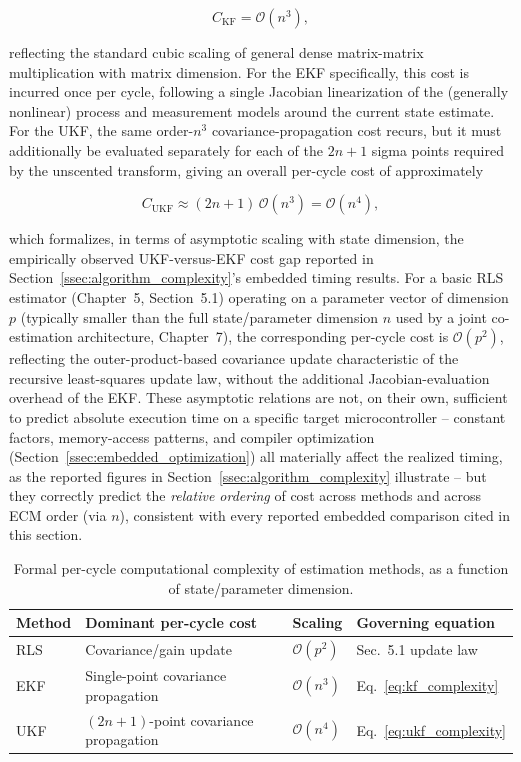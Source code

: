 \begin{equation}
	C_{\text{KF}} = \mathcal{O}(n^3),
	\label{eq:kf_complexity}
\end{equation}

\noindent reflecting the standard cubic scaling of general dense matrix-matrix multiplication with matrix dimension. For the EKF specifically, this cost is incurred once per cycle, following a single Jacobian linearization of the (generally nonlinear) process and measurement models around the current state estimate. For the UKF, the same order-$n^3$ covariance-propagation cost recurs, but it must additionally be evaluated separately for each of the $2n+1$ sigma points required by the unscented transform, giving an overall per-cycle cost of approximately

\begin{equation}
	C_{\text{UKF}} \approx (2n+1)\, \mathcal{O}(n^3) = \mathcal{O}(n^4),
	\label{eq:ukf_complexity}
\end{equation}

\noindent which formalizes, in terms of asymptotic scaling with state dimension, the empirically observed UKF-versus-EKF cost gap reported in Section~\ref{ssec:algorithm_complexity}'s embedded timing results. For a basic RLS estimator (Chapter~5, Section~5.1) operating on a parameter vector of dimension $p$ (typically smaller than the full state/parameter dimension $n$ used by a joint co-estimation architecture, Chapter~7), the corresponding per-cycle cost is $\mathcal{O}(p^2)$, reflecting the outer-product-based covariance update characteristic of the recursive least-squares update law, without the additional Jacobian-evaluation overhead of the EKF. These asymptotic relations are not, on their own, sufficient to predict absolute execution time on a specific target microcontroller -- constant factors, memory-access patterns, and compiler optimization (Section~\ref{ssec:embedded_optimization}) all materially affect the realized timing, as the reported figures in Section~\ref{ssec:algorithm_complexity} illustrate -- but they correctly predict the \emph{relative ordering} of cost across methods and across ECM order (via $n$), consistent with every reported embedded comparison cited in this section.

\begin{table}[htbp]
	\centering
	\caption{Formal per-cycle computational complexity of estimation methods, as a function of state/parameter dimension.}
	\label{tab:formal_complexity}
	\begin{tabular}{p{2.6cm}p{3.4cm}p{3.4cm}p{3.4cm}}
		\toprule
		Method & Dominant per-cycle cost & Scaling & Governing equation \\
		\midrule
		RLS & Covariance/gain update & $\mathcal{O}(p^2)$ & Sec.~5.1 update law \\
		EKF & Single-point covariance propagation & $\mathcal{O}(n^3)$ & Eq.~\eqref{eq:kf_complexity} \\
		UKF & $(2n{+}1)$-point covariance propagation & $\mathcal{O}(n^4)$ & Eq.~\eqref{eq:ukf_complexity} \\
		\bottomrule
	\end{tabular}
\end{table}

